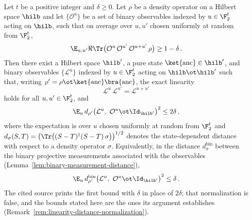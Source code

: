 \begin{theorem}
	\label{thm:linearity}
	\leanok
	Let $t$ be a positive integer and $\delta \ge 0$. Let $\rho$ be a
	density operator on a Hilbert space $\hilb$ and let
	$\{\mathcal{O}^u\}$ be a set of binary observables indexed by
	$u \in \F_2^t$ acting on $\hilb$, such that on average over $u, u'$
	chosen uniformly at random from $\F_2^t$,
	\[
		\E_{u,u'} \Re \Tr\big(\mathcal{O}^u \, \mathcal{O}^{u'} \,
		\mathcal{O}^{u+u'} \, \rho\big) \ge 1 - \delta\,.
	\]
	Then there exist a Hilbert space $\hilb'$, a pure state
	$\ket{\mathrm{anc}} \in \hilb'$, and binary observables
	$\{\mathcal{L}^u\}$ indexed by $u \in \F_2^t$ acting on
	$\hilb \ot \hilb'$ such that, writing
	$\rho' = \rho \ot \ket{\mathrm{anc}}\bra{\mathrm{anc}}$, the exact
	linearity
	\[
		\mathcal{L}^u \, \mathcal{L}^{u'} = \mathcal{L}^{u+u'}
	\]
	holds for all $u, u' \in \F_2^t$, and
	\[
		\E_{u} \, d_{\rho'}\big(\mathcal{L}^u,\ \mathcal{O}^u \ot
		\Id_{\hilb'}\big)^2 \le 2\delta\,,
	\]
	where the expectation is over $u$ chosen uniformly at random from
	$\F_2^t$ and
	$d_{\sigma}(S,T)
	= \big(\Tr\big((S-T)^\dagger (S-T)\, \sigma\big)\big)^{1/2}$
	denotes the state-dependent distance with respect to a density
	operator $\sigma$. Equivalently, in the distance $d^{\mathrm{bin}}_\sigma$
	between the binary projective measurements associated with the
	observables (Lemma~\ref{lem:binary-measurement-distance}),
	\[
		\E_{u} \, d^{\mathrm{bin}}_{\rho'}\big(\mathcal{L}^u,\
		\mathcal{O}^u \ot \Id_{\hilb'}\big)^2 \le \delta\,.
	\]
	The cited source prints the first bound with $\delta$ in place of
	$2\delta$; that normalization is false, and the bounds stated here are
	the ones its argument establishes
	(Remark~\ref{rem:linearity-distance-normalization}).
\end{theorem}
